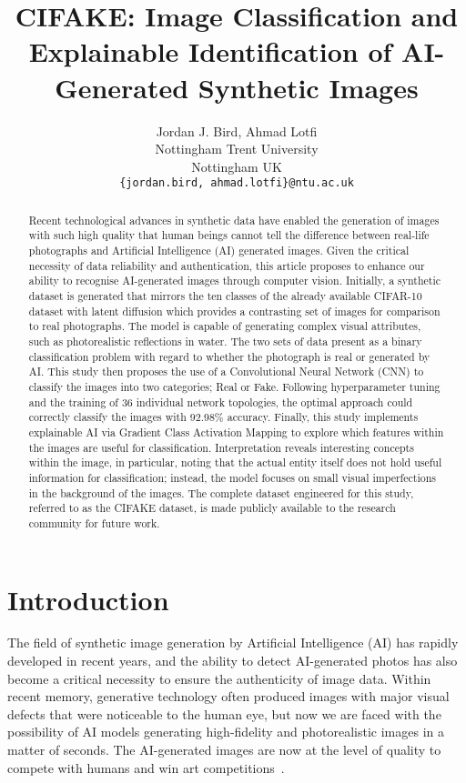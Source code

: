 \documentclass{article}
\title{CIFAKE: Image Classification and Explainable Identification of AI-Generated Synthetic Images}
\author{
  Jordan J. Bird, Ahmad Lotfi \\
  Nottingham Trent University \\
  Nottingham UK\\
  \texttt{\{jordan.bird, ahmad.lotfi\}@ntu.ac.uk} \\
  }
\begin{document}
\maketitle


\begin{abstract}
Recent technological advances in synthetic data have enabled the generation of images with such high quality that human beings cannot tell the difference between real-life photographs and Artificial Intelligence (AI) generated images. Given the critical necessity of data reliability and authentication, this article proposes to enhance our ability to recognise AI-generated images through computer vision. Initially, a synthetic dataset is generated that mirrors the ten classes of the already available CIFAR-10 dataset with latent diffusion which provides a contrasting set of images for comparison to real photographs. The model is capable of generating complex visual attributes, such as photorealistic reflections in water. The two sets of data present as a binary classification problem with regard to whether the photograph is real or generated by AI. This study then proposes the use of a Convolutional Neural Network (CNN) to classify the images into two categories; Real or Fake. Following hyperparameter tuning and the training of 36 individual network topologies, the optimal approach could correctly classify the images with 92.98\% accuracy. Finally, this study implements explainable AI via Gradient Class Activation Mapping to explore which features within the images are useful for classification. Interpretation reveals interesting concepts within the image, in particular, noting that the actual entity itself does not hold useful information for classification; instead, the model focuses on small visual imperfections in the background of the images. The complete dataset engineered for this study, referred to as the CIFAKE dataset, is made publicly available to the research community for future work.
\end{abstract}




\section{Introduction}
The field of synthetic image generation by Artificial Intelligence (AI) has rapidly developed in recent years, and the ability to detect AI-generated photos has also become a critical necessity to ensure the authenticity of image data. Within recent memory, generative technology often produced images with major visual defects that were noticeable to the human eye, but now we are faced with the possibility of AI models generating high-fidelity and photorealistic images in a matter of seconds. The AI-generated images are now at the level of quality to compete with humans and win art competitions~\cite{roose2022ai}. 
\end{document}
